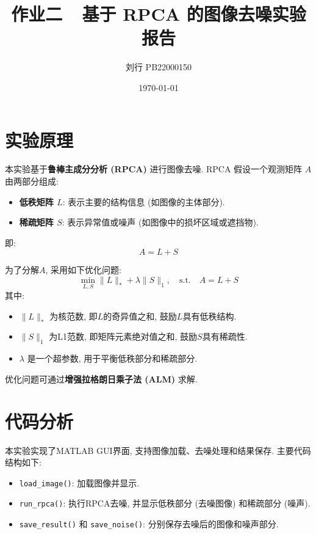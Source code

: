 \documentclass[10pt]{article}
\title{\textbf{作业二~~基于 RPCA 的图像去噪实验报告}}
\author{刘行 PB22000150}
\date{\today}
\begin{document}
	\maketitle

	\section{实验原理}
		本实验基于\textbf{鲁棒主成分分析 (RPCA) }进行图像去噪. RPCA 假设一个观测矩阵 $A$ 由两部分组成:

		\begin{itemize}
			\item \textbf{低秩矩阵 $L$}: 表示主要的结构信息 (如图像的主体部分).
			\item \textbf{稀疏矩阵 $S$}: 表示异常值或噪声 (如图像中的损坏区域或遮挡物).
		\end{itemize}

		即:
		\begin{equation}
		A = L + S
		\end{equation}

		为了分解$A$, 采用如下优化问题:
		\begin{equation}
			\min_{L, S} \|L\|_* + \lambda \|S\|_1, \quad \text{s.t.} \quad A = L + S
		\end{equation}
		其中:

		\begin{itemize}
			\item $\|L\|_*$ 为核范数, 即$L$的奇异值之和, 鼓励$L$具有低秩结构.
			\item $\|S\|_1$ 为L1范数, 即矩阵元素绝对值之和, 鼓励$S$具有稀疏性.
			\item $\lambda$ 是一个超参数, 用于平衡低秩部分和稀疏部分.
		\end{itemize}

		优化问题可通过\textbf{增强拉格朗日乘子法 (ALM) }求解.

	\section{代码分析}

		本实验实现了MATLAB GUI界面, 支持图像加载、去噪处理和结果保存. 主要代码结构如下:

		\begin{itemize}
			\item \texttt{load\_image()}: 加载图像并显示.
			\item \texttt{run\_rpca()}: 执行RPCA去噪, 并显示低秩部分 (去噪图像) 和稀疏部分 (噪声).
			\item \texttt{save\_result()} 和 \texttt{save\_noise()}: 分别保存去噪后的图像和噪声部分.
		\end{itemize}
\end{document}
